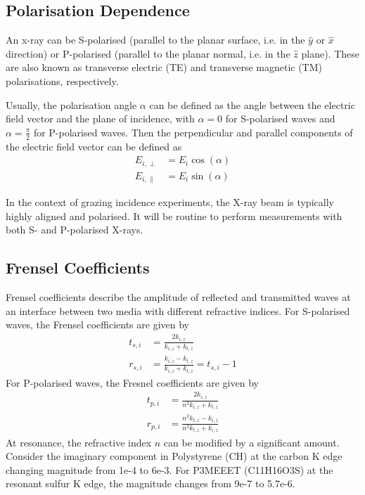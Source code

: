 \documentclass[../main.tex]{subfiles}
\begin{document}
	\subsection{Polarisation Dependence}
	An x-ray can be S-polarised (parallel to the planar surface, i.e. in the $\hat{y}$ or $\hat{x}$ direction) or P-polarised (parallel to the planar normal, i.e. in the $\hat{z}$ plane). These are also known as transverse electric (TE) and transverse magnetic (TM) polarisations, respectively.

	Usually, the polarisation angle $\alpha$ can be defined as the angle between the electric field vector and the plane of incidence, with $\alpha = 0$ for S-polarised waves and $\alpha = \frac{\pi}{2}$ for P-polarised waves. Then the perpendicular and parallel components of the electric field vector can be defined as
	\begin{align}
		E_{i, \perp} &= E_i \cos(\alpha) \\
		E_{i, \parallel} &= E_i \sin(\alpha)
	\end{align}

	In the context of grazing incidence experiments, the X-ray beam is typically highly aligned and polarised. It will be routine to perform measurements with both S- and P-polarised X-rays.

	\subsection{Frensel Coefficients}
	Frensel coefficients describe the amplitude of reflected and transmitted waves at an interface between two media with different refractive indices. For S-polarised waves, the Frensel coefficients are given by
	\begin{align}
		t_{s, i} &= \frac{2 k_{i, z}}{k_{i, z} + k_{t, z}} \\
		r_{s, i} &= \frac{k_{i, z} - k_{t, z}}{k_{i,z} + k_{t,z}} = t_{s,i} - 1
	\end{align}
	For P-polarised waves, the Fresnel coefficients are given by
	\begin{align}
		t_{p, i} &= \frac{2 k_{i, z}}{n^2 k_{i, z} + k_{t, z}} \\
		r_{p, i} &= \frac{n^2 k_{t, z} - k_{i, z}}{n^2 k_{t,z} + k_{i,z}}
	\end{align}
	At resonance, the refractive index $n$ can be modified by a significant amount. Consider the imaginary component in Polystyrene (CH) at the carbon K edge changing magnitude from 1e-4 to 6e-3. For P3MEEET (C11H16O3S) at the resonant sulfur K edge, the magnitude changes from 9e-7 to 5.7e-6.
\end{document}
